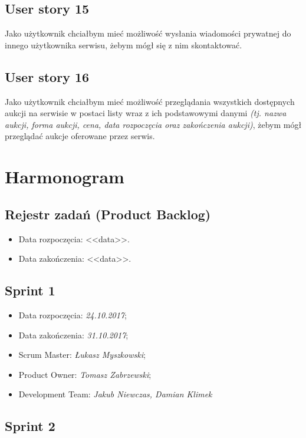 \documentclass[a4paper]{article}
\begin{document}
	\subsection{User story 15}
	Jako użytkownik chciałbym mieć możliwość wysłania wiadomości prywatnej do innego użytkownika serwisu, żebym mógł się z nim skontaktować. 
	
	\subsection{User story 16}
	Jako użytkownik chciałbym mieć możliwość przeglądania wszystkich dostępnych aukcji na serwisie w postaci listy wraz z ich podstawowymi danymi \emph{(tj. nazwa aukcji, forma aukcji, cena, data rozpoczęcia oraz zakończenia aukcji)}, żebym mógł przeglądać aukcje oferowane przez serwis.
		
	\section{Harmonogram}
	
	\subsection{Rejestr zadań (Product Backlog)}
	
	\begin{itemize}
		\item Data rozpoczęcia: <<data>>.
		\item  Data zakończenia: <<data>>.
	\end{itemize}
	
	\subsection{Sprint 1}
	
	\begin{itemize}
		\item Data rozpoczęcia: \emph{24.10.2017};
		\item Data zakończenia: \emph{31.10.2017};
		\item Scrum Master: \emph{Łukasz Myszkowski};
		\item Product Owner: \emph{Tomasz Zabrzewski};
		\item Development Team: \emph{Jakub Niewczas, Damian Klimek}
	\end{itemize}
	
	\subsection{Sprint 2}
	
\end{document}
